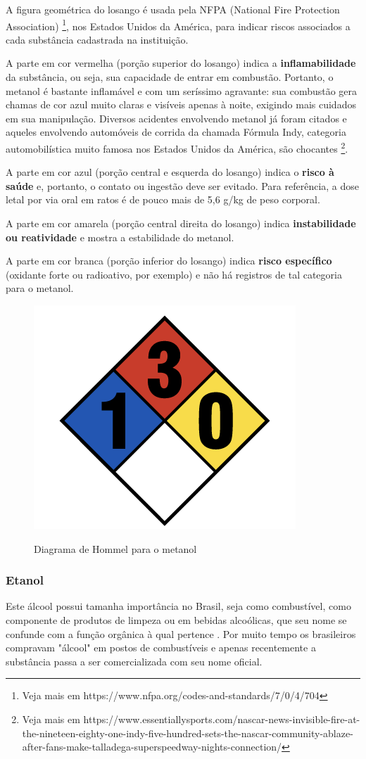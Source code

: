 A figura geométrica do losango é usada pela NFPA (National Fire Protection Association) \footnote{Veja mais em https://www.nfpa.org/codes-and-standards/7/0/4/704}, nos Estados Unidos da América, para indicar riscos associados a cada substância cadastrada na instituição.

A parte em cor vermelha (porção superior do losango) indica a \textbf{inflamabilidade} da substância, ou seja, sua capacidade de entrar em combustão. Portanto, o metanol é bastante inflamável e com um seríssimo agravante: sua combustão gera chamas de cor azul muito claras e visíveis apenas à noite, exigindo mais cuidados em sua manipulação. Diversos acidentes envolvendo metanol já foram citados e aqueles envolvendo automóveis de corrida da chamada Fórmula Indy, categoria automobilística muito famosa nos Estados Unidos da América, são chocantes \footnote{Veja mais em https://www.essentiallysports.com/nascar-news-invisible-fire-at-the-nineteen-eighty-one-indy-five-hundred-sets-the-nascar-community-ablaze-after-fans-make-talladega-superspeedway-nights-connection/}.

A parte em cor azul (porção central e esquerda do losango) indica o \textbf{risco à saúde} e, portanto, o contato ou ingestão deve ser evitado. Para referência, a dose letal por via oral em ratos é de pouco mais de 5,6 g/kg de peso corporal.

A parte em cor amarela (porção central direita do losango) indica \textbf{instabilidade ou reatividade} e mostra a estabilidade do metanol.

A parte em cor branca (porção inferior do losango) indica \textbf{risco específico} (oxidante forte ou radioativo, por exemplo) e não há registros de tal categoria para o metanol.


\begin{figure}[h]
    \centering
    \caption{Diagrama de Hommel para o metanol}
    \vspace{0.5cm}
    \includegraphics[width=0.25\linewidth]{imagens/hommel.png}
\label{fig:hommel}
\end{figure}

\subsubsection{Etanol}
Este álcool possui tamanha importância no Brasil, seja como combustível, como componente de produtos de limpeza ou em bebidas alcoólicas, que seu nome se confunde com a função orgânica à qual pertence \cite{raizen}. Por muito tempo os brasileiros compravam "álcool" em postos de combustíveis e apenas recentemente a substância passa a ser comercializada com seu nome oficial.

